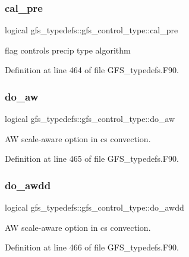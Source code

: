 \subsubsection{cal\+\_\+pre}
{\footnotesize\ttfamily logical gfs\+\_\+typedefs\+::gfs\+\_\+control\+\_\+type\+::cal\+\_\+pre}



flag controls precip type algorithm 



Definition at line 464 of file G\+F\+S\+\_\+typedefs.\+F90.

\mbox{\label{structgfs__typedefs_1_1gfs__control__type_aa03016e782c982d19e27b6735fd6ec9a}} 
\subsubsection{do\+\_\+aw}
{\footnotesize\ttfamily logical gfs\+\_\+typedefs\+::gfs\+\_\+control\+\_\+type\+::do\+\_\+aw}



AW scale-\/aware option in cs convection. 



Definition at line 465 of file G\+F\+S\+\_\+typedefs.\+F90.

\mbox{\label{structgfs__typedefs_1_1gfs__control__type_ab573db391511bb5308271180c7c9e719}} 
\subsubsection{do\+\_\+awdd}
{\footnotesize\ttfamily logical gfs\+\_\+typedefs\+::gfs\+\_\+control\+\_\+type\+::do\+\_\+awdd}



AW scale-\/aware option in cs convection. 



Definition at line 466 of file G\+F\+S\+\_\+typedefs.\+F90.

\mbox{\label{structgfs__typedefs_1_1gfs__control__type_a614081711c7a29ff08b80d472c7e3428}} 
